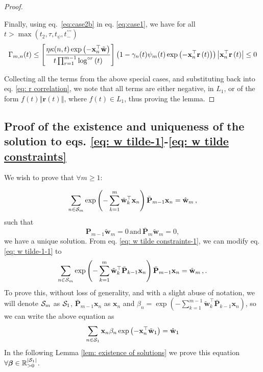 \documentclass[twoside,11pt,english]{article}
\begin{document}
\begin{proof}
\begin{asparaenum}
\begin{compactenum}
Finally, using eq.~\ref{eq:case2b} in eq. \ref{eq:case1}, we have for all $t>\max{(t_2,\tau,t_\psi,t_-^{\prime\prime\prime})}$
\begin{align}
 \Gamma_{m,n}(t)
\le \left[\frac{\eta\kappa(n,t)\exp\left(-\mathbf{x}_{n}^{\top}\tilde{\mathbf{w}}\right)}{t\prod_{r=1}^{m-1}\log^{\circ r}\left(t\right)}\right]\left(1-\gamma_n(t)\psi_m(t)\exp\left(-\mathbf{x}_{n}^{\top}\mathbf{r}\left(t\right)\right)\right)\left|\mathbf{x}_{n}^{\top}\mathbf{r}\left(t\right)\right|\leq 0
\end{align}
    \end{compactenum}
\end{asparaenum}

Collecting all the terms from the above special cases, and substituting
back into eq. \ref{eq: r correlation}, we note that all terms are
either negative, in $L_{1}$, or of the form $f\left(t\right)\left\Vert \mathbf{r}\left(t\right)\right\Vert $,
where $f\left(t\right)\in L_{1}$, thus proving the lemma. 
\end{proof}

\subsection{Proof of the existence and uniqueness of the solution to eqs. \ref{eq: w tilde-1}-\ref{eq: w tilde constraints} \label{subsec: existence 1}}

We wish to prove that $\forall m\geq1:$

\begin{equation}
\sum_{n\in\mathcal{S}_{m}}\exp\left(-\sum_{k=1}^{m}\tilde{\mathbf{w}}_{k}^{\top}\mathbf{x}_{n}\right)\bar{\mathbf{P}}_{m-1}\mathbf{x}_{n}=\hat{\mathbf{w}}_{m}\,,\label{eq: w tilde-1-1}
\end{equation}
such that 
\begin{equation}
\mathbf{P}_{m-1}\tilde{\mathbf{w}}_{m}=0\,\mathrm{and}\,\bar{\mathbf{P}}_{m}\tilde{\mathbf{w}}_{m}=0,\label{eq: w tilde constraints-1}
\end{equation}
we have a unique solution. From eq. \ref{eq: w tilde constraints-1},
we can modify eq. \ref{eq: w tilde-1-1} to 
\[
\sum_{n\in\mathcal{S}_{m}}\exp\left(-\sum_{k=1}^{m}\tilde{\mathbf{w}}_{k}^{\top}\bar{\mathbf{P}}_{k-1}\mathbf{x}_{n}\right)\bar{\mathbf{P}}_{m-1}\mathbf{x}_{n}=\hat{\mathbf{w}}_{m}\,,.
\]
To prove this, without loss of generality, and with a slight abuse
of notation, we will denote $\mathcal{S}_{m}$ as $\mathcal{S}_{1}$, $\bar{\mathbf{P}}_{m-1}\mathbf{x}_{n}$
as $\mathbf{x}_{n}$ and $\beta_{n}=\exp\left(-\sum_{k=1}^{m-1}\tilde{\mathbf{w}}_{k}^{\top}\bar{\mathbf{P}}_{k-1}\mathbf{x}_{n}\right)$,
so we can write the above equation as
\[
\sum_{n\in\mathcal{S}_{1}}\mathbf{x}_{n}\beta_{n}\exp\left(-\mathbf{x}_{n}^{\top}\tilde{\mathbf{w}}_{1}\right)=\hat{\mathbf{w}}_{1}
\]
In the following Lemma \ref{lem: existence of solutions} we prove
this equation $\forall\boldsymbol{\beta}\in\mathbb{R}_{>0}^{\left|\mathcal{S}_{1}\right|}$.
\end{document}

